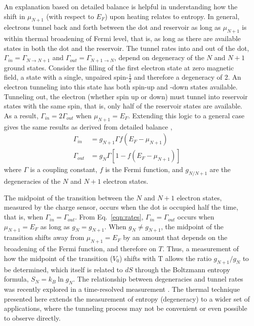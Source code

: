 \documentclass[twocolumn,showpacs,preprintnumbers,amsmath,amssymb,pra,aps,superscriptaddress]{revtex4-1}
\begin{document}
An explanation based on detailed balance is helpful in understanding how the shift in $\mu_{N+1}$ (with respect to $E_F$) upon heating relates to entropy.   In general, electrons tunnel back and forth between the dot and reservoir as long as $\mu_{N+1}$ is within thermal broadening of Fermi level, that is, as long as there are available states in both the dot and the reservoir.  The tunnel rates into and out of the dot, $\Gamma_{in}=\Gamma_{N\rightarrow N+1}$ and $\Gamma_{out}=\Gamma_{N+1\rightarrow N}$, depend on degeneracy of the $N$ and $N+1$ ground states.  Consider the filling of the first electron state at zero magnetic field, a state with a single, unpaired spin-$\frac{1}{2}$ and therefore a degeneracy of 2. An electron tunneling into this state has both spin-up and -down states available.  Tunneling out, the electron (whether spin up or down) must tunnel into reservoir states with the same spin, that is, only half of the reservoir states are available. As a result, $\Gamma_{in} = 2\Gamma_{out}$ when $\mu_{N+1}=E_F$. Extending this logic to a general case gives the same results as derived from detailed balance \cite{Gustavsson2009}, 
%
\begin{align}
	\Gamma_{in} &=  g_{N+1} \Gamma f(E_F - \mu_{N+1}) \label{eqn:rates}\\
	\Gamma_{out} &= g_{N} \Gamma [1 - f(E_F - \mu_{N+1})] \nonumber
\end{align}
%
where $\Gamma$ is a coupling constant, $f$ is the Fermi function, and $g_{N/N+1}$ are the degeneracies of the $N$ and $N+1$ electron states.

The midpoint of the transition between the $N$ and $N+1$ electron states, measured by the charge sensor, occurs when the dot is occupied half the time, that is, when $\Gamma_{in} = \Gamma_{out}$. From Eq.~\ref{eqn:rates}, $\Gamma_{in} = \Gamma_{out}$ occurs when $\mu_{N+1} = E_F$ as long as $g_{N}=g_{N+1}$. When $g_{N}\neq g_{N+1}$, the midpoint of the transition shifts away from $\mu_{N+1}=E_F$ by an amount that depends on the broadening of the Fermi function, and therefore on $T$.   Thus, a measurement of how the midpoint of the transition ($V_0$) shifts with T allows the ratio $g_{N+1}/g_{N}$ to be determined, which itself is related to $dS$ through the Boltzmann entropy formula, $S_{N}=k_{B} \ln{g_N}$.  The relationship between degeneracies and tunnel rates was recently explored in a time-resolved measurement \cite{Hofmann2016}.  The thermal technique presented here extends the measurement of entropy (degeneracy) to a wider set of applications, where the tunneling process may not be convenient or even possible to observe directly.
\end{document}
